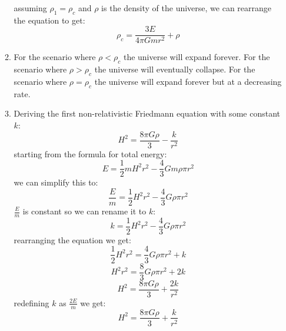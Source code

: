 \documentclass{article}
\theoremstyle{plain}
\begin{document}
\begin{enumerate}
\begin{enumerate}[label=(\alph*)]
                    assuming $\rho_1 = \rho_c$ and $\rho$ is the density of the universe, we can rearrange the equation to get:
                    \begin{equation*}
                        \rho_c = \frac{3E}{4\pi G m r^2} + \rho
                    \end{equation*}
              \item For the scenario where $\rho < \rho_c$ the universe will expand forever.
                    For the scenario where $\rho > \rho_c$ the universe will eventually collapse.
                    For the scenario where $\rho = \rho_c$ the universe will expand forever but at a decreasing rate.
              \item Deriving the first non-relativistic Friedmann equation with some constant $k$:
                    \begin{equation*}
                        H^2 = \frac{8\pi G \rho}{3} - \frac{k}{r^2}
                    \end{equation*}
                    starting from the formula for total energy:
                    \begin{equation*}
                        E = \frac{1}{2}m H^2r^2 - \frac{4}{3}G m \rho \pi r^2
                    \end{equation*}
                    we can simplify this to:
                    \begin{equation*}
                        \frac{E}{m} = \frac{1}{2}H^2r^2 - \frac{4}{3}G \rho \pi r^2
                    \end{equation*}
                    $\frac{E}{m}$ is constant so we can rename it to $k$:
                    \begin{equation*}
                        k = \frac{1}{2}H^2r^2 - \frac{4}{3}G \rho \pi r^2
                    \end{equation*}
                    rearranging the equation we get:
                    \begin{equation*}
                        \frac{1}{2}H^2r^2 =  \frac{4}{3}G \rho \pi r^2 + k
                    \end{equation*}
                    \begin{equation*}
                        H^2r^2 =  \frac{8}{3}G \rho \pi r^2 + 2k
                    \end{equation*}
                    \begin{equation*}
                        H^2 = \frac{8 \pi G \rho}{3}  + \frac{2k}{r^2}
                    \end{equation*}
                    redefining $k$ as $\frac{2E}{m}$ we get:
                    \begin{equation*}
                        H^2 = \frac{8 \pi G \rho}{3}  + \frac{k}{r^2}
                    \end{equation*}




\end{enumerate}
\end{enumerate}
\end{document}
